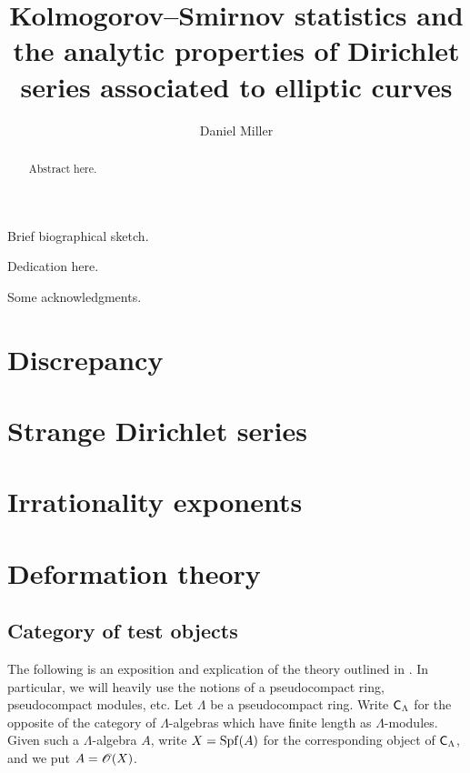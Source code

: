 \documentclass[phd,cornellheadings,draft]{cornell}
\title{Kolmogorov--Smirnov statistics and the analytic properties of Dirichlet series associated to elliptic curves}
\author{Daniel Miller}
\begin{document}
\maketitle
\makecopyright

\begin{abstract}
Abstract here. 
\end{abstract}

\begin{biosketch}
Brief biographical sketch.
\end{biosketch}

\begin{dedication}
Dedication here.
\end{dedication}

\begin{acknowledgements}
Some acknowledgments.
\end{acknowledgements}

\contentspage

\normalspacing
\setcounter{page}{1}
\pagestyle{cornell}










\chapter{Discrepancy}
\chapter{Strange Dirichlet series}
\chapter{Irrationality exponents}
\chapter{Deformation theory}





\section{Category of test objects}

The following is an exposition and explication of the theory outlined in 
\cite[VII\textsubscript{B}, \S 0--1]{sga3-1}. In particular, we will heavily 
use the notions of a pseudocompact ring, pseudocompact modules, etc. Let 
$\Lambda$ be a pseudocompact ring. Write $\mathsf{C}_\Lambda$ for the opposite 
of the category of $\Lambda$-algebras which have finite length as 
$\Lambda$-modules. Given such a $\Lambda$-algebra $A$, write $X=\operatorname{Spf}(A)$ for 
the corresponding object of $\mathsf{C}_\Lambda$, and we put $A=\mathscr{O}(X)$. 
\end{document}
